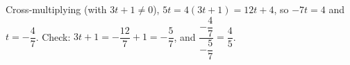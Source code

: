 Cross-multiplying (with $3t+1\ne0$), $5t=4(3t+1)=12t+4$, so $-7t=4$ and $t=\boxed{-\dfrac47}$. Check: $3t+1=-\dfrac{12}{7}+1=-\dfrac57$, and $\dfrac{-\dfrac47}{-\dfrac57}=\dfrac45$.
